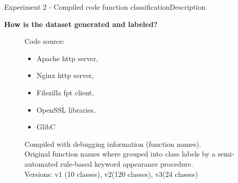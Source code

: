 \documentclass[xcolor=table]{beamer}
\begin{document}
\begin{frame}{Experiment 2 - Compiled code function classification}{Description}


\textbf{How is the dataset generated and labeled?}



\begin{figure}[H]

Code source:
\begin{itemize}
    \item Apache http server,
    \item Nginx http server,
    \item Filezilla fpt client,
    \item OpenSSL libraries,
    \item GlibC
\end{itemize}
\endminipage
\hfill
{}%
Compiled with debugging information (function names).\\

Original function names where grouped into class labels by a semi-automated rule-based keyword appearance procedure.
\\

Versions: v1 (10 classes), v2(120 classes), v3(24 classes)

\endminipage
\end{figure}







\end{frame}
\end{document}
